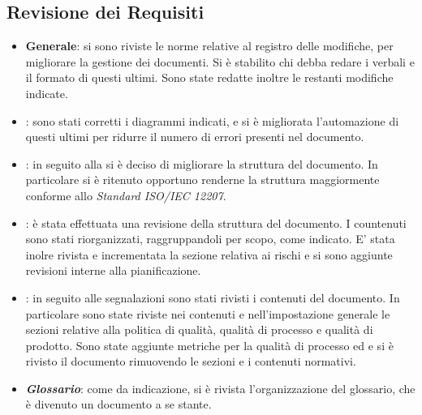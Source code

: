 \documentclass[12pt,a4paper]{article}
\begin{document}
\subsection{Revisione dei Requisiti}
\begin{itemize}
	\item \textbf{Generale}: si sono riviste le norme relative al registro delle modifiche, per migliorare la gestione dei documenti. Si è stabilito chi debba redare i verbali e il formato di questi ultimi. Sono state redatte inoltre le restanti modifiche indicate.
	\item \textbf{\AdR}: sono stati corretti i diagrammi indicati, e si è migliorata l'automazione di questi ultimi per ridurre il numero di errori presenti nel documento.
	\item \textbf{\NdP}: in seguito alla \RR si è deciso di migliorare la struttura del documento. In particolare si è ritenuto opportuno renderne la struttura maggiormente conforme allo \textit{Standard ISO/IEC 12207}.
	\item \textbf{\PdP}: è stata effettuata una revisione della struttura del documento. I countenuti sono stati riorganizzati, raggruppandoli per scopo, come indicato. E' stata inolre rivista e incrementata la sezione relativa ai rischi e si sono aggiunte revisioni interne alla pianificazione.
	\item \textbf{\PdQ}: in seguito alle segnalazioni sono stati rivisti i contenuti del documento. In particolare sono state riviste nei contenuti e nell'impostazione generale le sezioni relative alla politica di qualità, qualità di processo e qualità di prodotto. Sono state aggiunte metriche per la qualità di processo ed e si è rivisto il documento rimuovendo le sezioni e i contenuti normativi. 
	\item \textbf{\textit{Glossario}}: come da indicazione, si è rivista l'organizzazione del glossario, che è divenuto un documento a se stante. 
\end{itemize}
\newpage
\printglossary[title={Glossario}]
\end{document}
